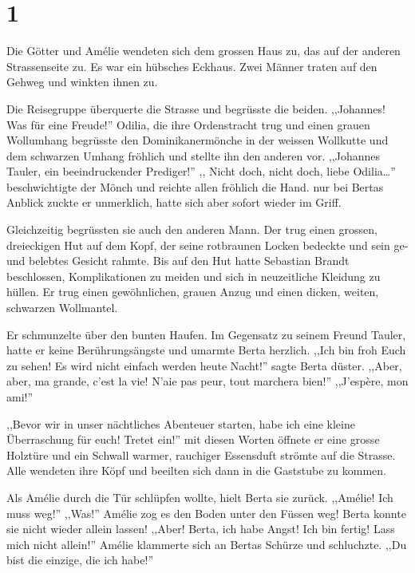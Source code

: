 \section*{1}

Die Götter und Amélie wendeten sich dem grossen Haus zu, das auf der anderen Strassenseite zu. Es war ein hübsches Eckhaus. Zwei Männer traten auf den Gehweg und winkten ihnen zu.

Die Reisegruppe überquerte die Strasse und begrüsste die beiden. ,,Johannes! Was für eine Freude!'' Odilia, die ihre Ordenstracht trug und einen grauen Wollumhang begrüsste den Dominikanermönche in der weissen Wollkutte und dem schwarzen Umhang fröhlich und stellte ihn den anderen vor. ,,Johannes Tauler, ein beeindruckender Prediger!'' ,, Nicht doch, nicht doch, liebe Odilia\dots '' beschwichtigte der Mönch und reichte allen fröhlich die Hand. nur bei Bertas Anblick zuckte er unmerklich, hatte sich aber sofort wieder im Griff.

Gleichzeitig begrüssten sie auch den anderen Mann. Der trug einen grossen, dreieckigen Hut auf dem Kopf, der seine rotbraunen Locken bedeckte und sein ge- und belebtes Gesicht rahmte. Bis auf den Hut hatte Sebastian Brandt beschlossen, Komplikationen zu meiden und sich in neuzeitliche Kleidung zu hüllen. Er trug einen gewöhnlichen, grauen Anzug und einen dicken, weiten, schwarzen Wollmantel. 

Er schmunzelte über den bunten Haufen. Im Gegensatz zu seinem Freund Tauler, hatte er keine Berührungsängste und umarmte Berta herzlich. ,,Ich bin froh Euch zu sehen! Es wird nicht einfach werden heute Nacht!'' sagte Berta düster. ,,Aber, aber, ma grande, c'est la vie! N'aie pas peur, tout marchera bien!'' ,,J'espère, mon ami!''

,,Bevor wir in unser nächtliches Abenteuer starten, habe ich eine kleine Überraschung für euch! Tretet ein!'' mit diesen Worten öffnete er eine grosse Holztüre und ein Schwall warmer, rauchiger Essensduft strömte auf die Strasse. Alle wendeten ihre Köpf und beeilten sich dann in die Gaststube zu kommen.


Als Amélie durch die Tür schlüpfen wollte, hielt Berta sie zurück. ,,Amélie! Ich muss weg!'' ,,Was!'' Amélie zog es den Boden unter den Füssen weg! Berta konnte sie nicht wieder allein lassen! ,,Aber! Berta, ich habe Angst! Ich bin fertig! Lass mich nicht allein!'' Amélie klammerte sich an Bertas Schürze und schluchzte. ,,Du bist die einzige, die ich habe!''

